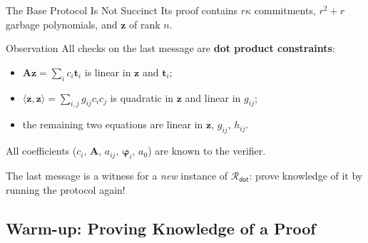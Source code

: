\documentclass{zkdl-presentation-template}
\begin{document}
    \begin{frame}{The Base Protocol Is Not Succinct}
        Its proof contains $r\kappa$ commitments, $r^2 + r$ garbage polynomials, and $\mathbf{z}$ of rank $n$.
        \pause

        \begin{alertblock}{Observation}
            All checks on the last message are \textbf{dot product constraints}:
            \begin{itemize}
                \item $\mathbf{A}\mathbf{z} = \sum_i c_i\mathbf{t}_i$ is linear in $\mathbf{z}$ and $\mathbf{t}_i$;
                \item $\langle \mathbf{z}, \mathbf{z} \rangle = \sum_{i,j} g_{ij}c_ic_j$ is quadratic in $\mathbf{z}$ and linear in $g_{ij}$;
                \item the remaining two equations are linear in $\mathbf{z}$, $g_{ij}$, $h_{ij}$.
            \end{itemize}
            All coefficients ($c_i$, $\mathbf{A}$, $a_{ij}$, $\boldsymbol{\varphi}_i$, $a_0$) are known to the verifier.
        \end{alertblock}
        \pause

        The last message is a witness for a \emph{new} instance of $\mathcal{R}_{\mathsf{dot}}$: prove knowledge of it by running the protocol again!
    \end{frame}

    \subsection{Warm-up: Proving Knowledge of a Proof}
\end{document}
